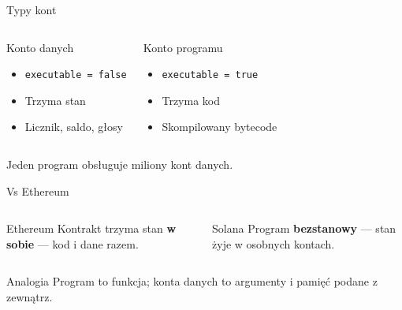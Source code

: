 \begin{frame}{Typy kont}
  \begin{columns}
      \begin{block}{Konto danych}
        \begin{itemize}
          \item \texttt{executable = false}
          \item Trzyma stan
          \item Licznik, saldo, głosy
        \end{itemize}
      \end{block}
      \begin{block}{Konto programu}
        \begin{itemize}
          \item \texttt{executable = true}
          \item Trzyma kod
          \item Skompilowany bytecode
        \end{itemize}
      \end{block}
  \end{columns}
  \vspace{0.3cm}
  \begin{center}
    \textcolor{stplmuted}{Jeden program obsługuje miliony kont danych.}
  \end{center}
\end{frame}

\begin{frame}{Vs Ethereum}
  \begin{columns}
      \begin{alertblock}{Ethereum}
        Kontrakt trzyma stan \textbf{w sobie} --- kod i dane razem.
      \end{alertblock}
      \begin{block}{Solana}
        Program \textbf{bezstanowy} --- stan żyje w osobnych kontach.
      \end{block}
  \end{columns}
  \vspace{0.3cm}
  \begin{exampleblock}{Analogia}
    Program to funkcja; konta danych to argumenty i pamięć podane z zewnątrz.
  \end{exampleblock}
\end{frame}

